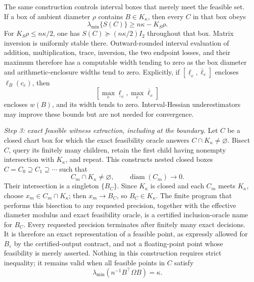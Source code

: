 The same construction controls interval boxes that merely meet the feasible set.  If a box of ambient diameter \(\rho\) contains \(B\in K_\kappa\), then every \(C\) in that box obeys
\[
\lambda_{\min}\{S(C)\}
\ge n\kappa-K_S\rho.
\]
For \(K_S\rho\le n\kappa/2\), one has \(S(C)\succeq(n\kappa/2)I_2\) throughout that box.  Matrix inversion is uniformly stable there.  Outward-rounded interval evaluation of addition, multiplication, trace, inversion, the two endpoint losses, and their maximum therefore has a computable width tending to zero as the box diameter and arithmetic-enclosure widths tend to zero.  Explicitly, if \([\underline\ell_e,\overline\ell_e]\) encloses \(\ell_B(c_e)\), then
\[
\left[
\max_e\underline\ell_e,
\max_e\overline\ell_e
\right]
\]
encloses \(w(B)\), and its width tends to zero.  Interval-Hessian underestimators may improve these bounds but are not needed for convergence.

\emph{Step 3: exact feasible witness extraction, including at the boundary.}
Let \(C\) be a closed chart box for which the exact feasibility oracle answers \(C\cap K_\kappa\ne\varnothing\).  Bisect \(C\), query its finitely many children, retain the first child having nonempty intersection with \(K_\kappa\), and repeat.  This constructs nested closed boxes \(C=C_0\supseteq C_1\supseteq\cdots\) such that
\[
C_m\cap K_\kappa\ne\varnothing,
\qquad
\operatorname{diam}(C_m)\longrightarrow0.
\]
Their intersection is a singleton \(\{B_C\}\).  Since \(K_\kappa\) is closed and each \(C_m\) meets \(K_\kappa\), choose \(x_m\in C_m\cap K_\kappa\); then \(x_m\to B_C\), so \(B_C\in K_\kappa\).  The finite program that performs this bisection to any requested precision, together with the effective diameter modulus and exact feasibility oracle, is a certified inclusion-oracle name for \(B_C\).  Every requested precision terminates after finitely many exact decisions.  It is therefore an exact representation of a feasible point, as expressly allowed for \(B_\varepsilon\) by the certified-output contract, and not a floating-point point whose feasibility is merely asserted.  Nothing in this construction requires strict inequality; it remains valid when all feasible points in \(C\) satisfy
\[
\lambda_{\min}\!\left(n^{-1}B^{\top}\Omega B\right)=\kappa.
\]

